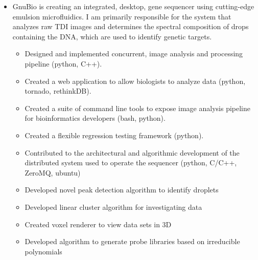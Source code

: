 \documentclass[11pt,a4paper,sans]{moderncv}        %
\begin{document}
\vspace{6pt}

\begin{itemize}

  \item{}

    GnuBio is creating an integrated, desktop, gene sequencer using cutting-edge
    emulsion microfluidics. I am primarily responsible for the system that
    analyzes raw TDI images and determines the spectral composition of drops
    containing the DNA, which are used to identify genetic targets.

    \begin{itemize}
      \item{Designed and implemented concurrent, image analysis and processing pipeline (python, C++).}
      \item{Created a web application to allow biologists to analyze data (python, tornado, rethinkDB).}
      \item{Created a suite of command line tools to expose image analysis pipeline for bioinformatics developers (bash, python).}
      \item{Created a flexible regression testing framework (python).}
      \item{Contributed to the architectural and algorithmic development of the distributed system used to operate the sequencer (python, C/C++, ZeroMQ, ubuntu)}
      \item{Developed novel peak detection algorithm to identify droplets}
      \item{Developed linear cluster algorithm for investigating data}
      \item{Created voxel renderer to view data sets in 3D}
      \item{Developed algorithm to generate probe libraries based on irreducible polynomials}
    \end{itemize}


\end{itemize}


\vspace{6pt}
\end{document}
